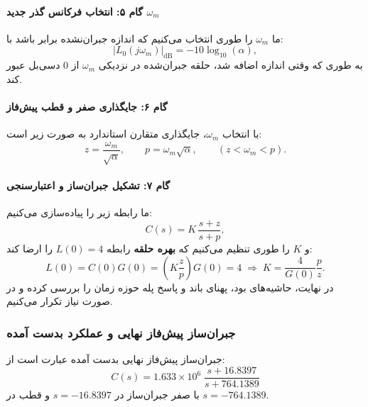 \documentclass[a4paper]{article}
\begin{document}
\paragraph{گام ۵: انتخاب فرکانس گذر جدید $\omega_m$}
ما $\omega_m$ را طوری انتخاب می‌کنیم که اندازه جبران‌نشده برابر باشد با:
\begin{equation}
	|L_0(j\omega_m)|_{\text{dB}} = -10\log_{10}(\alpha),
\end{equation}
به طوری که وقتی اندازه  اضافه شد، حلقه جبران‌شده در نزدیکی $\omega_m$ از 0 دسی‌بل عبور کند.

\paragraph{گام ۶: جایگذاری صفر و قطب پیش‌فاز}
با انتخاب $\omega_m$، جایگذاری متقارن استاندارد به صورت زیر است:
\begin{equation}
	z=\frac{\omega_m}{\sqrt{\alpha}},\qquad p=\omega_m\sqrt{\alpha},
	\qquad (z<\omega_m<p).
\end{equation}

\paragraph{گام ۷: تشکیل جبران‌ساز و اعتبارسنجی}
ما رابطه زیر را پیاده‌سازی می‌کنیم:
\begin{equation}
	C(s)=K\,\frac{s+z}{s+p},
\end{equation}
و $K$ را طوری تنظیم می‌کنیم که \textbf{بهره حلقه } رابطه $L(0)=4$ را ارضا کند:
\begin{equation}
	L(0)=C(0)G(0)=\left(K\frac{z}{p}\right)G(0)=4
	\;\Rightarrow\;
	K=\frac{4}{G(0)}\frac{p}{z}.
\end{equation}
در نهایت، حاشیه‌های بود، پهنای باند و پاسخ پله حوزه زمان را بررسی کرده و در صورت نیاز تکرار می‌کنیم.

\subsubsection{جبران‌ساز پیش‌فاز نهایی و عملکرد بدست آمده}
جبران‌ساز پیش‌فاز نهایی بدست آمده عبارت است از:
\begin{equation}
	\boxed{
		C(s)=1.633\times 10^{6}\;\frac{s+16.8397}{s+764.1389}
	}
\end{equation}
با صفر جبران‌ساز در $s=-16.8397$ و قطب در $s=-764.1389$.
\end{document}
